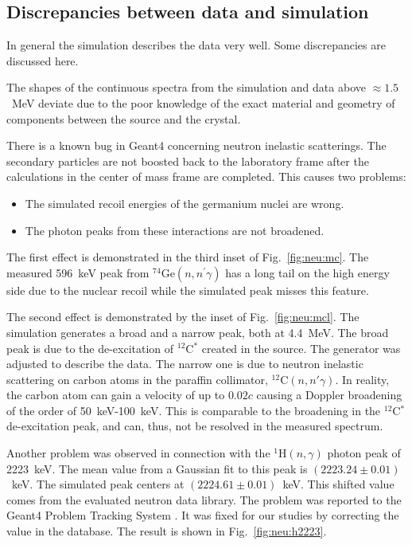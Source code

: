 \subsection{Discrepancies between data and simulation}
\label{sec:neu:dine}
In general the simulation describes the data very well. Some discrepancies are discussed here.

The shapes of the continuous spectra from the simulation and data above $\approx 1.5$~MeV deviate due to the poor knowledge of the exact material and geometry of components between the source and the crystal.

There is a known bug \cite{g4bug1} in Geant4 concerning neutron inelastic scatterings. The secondary particles are not boosted back to the laboratory frame after the calculations in the center of mass frame are completed. This causes two problems:
\begin{itemize}
\item The simulated recoil energies of the germanium nuclei are wrong.
\item The photon peaks from these interactions are not broadened.
\end{itemize}

The first effect is demonstrated in the third inset of Fig.~\ref{fig:neu:mc}. The measured 596~keV peak from $^{74}$Ge$(n,n^\prime\gamma)$ has a long tail on the high energy side due to the nuclear recoil while the simulated peak misses this feature.

The second effect is demonstrated by the inset of Fig.~\ref{fig:neu:mcl}.  The simulation generates a broad and a narrow peak, both at 4.4~MeV.  The broad peak is due to the de-excitation of $^{12}$C$^{*}$ created in the source. The generator was adjusted to describe the data. The narrow one is due to neutron inelastic scattering on carbon atoms in the paraffin collimator, $^{12}$C$(n,n'\gamma)$. In reality, the carbon atom can gain a velocity of up to $0.02c$ causing a Doppler broadening of the order of 50~keV-100~keV. This is comparable to the broadening in the $^{12}$C$^{*}$ de-excitation peak, and can, thus, not be resolved in the measured spectrum.

Another problem was observed in connection with the $^{1}$H$(n,\gamma)$ photon peak of 2223~keV. The mean value from a Gaussian fit to this peak is $(2223.24 \pm 0.01)$~keV. The simulated peak centers at $(2224.61 \pm 0.01)$~keV. This shifted value comes from the evaluated neutron data library. The problem was reported to the Geant4 Problem Tracking System \cite{g4bug2}. It was fixed for our studies by correcting the value in the database. The result is shown in Fig.~\ref{fig:neu:h2223}.

